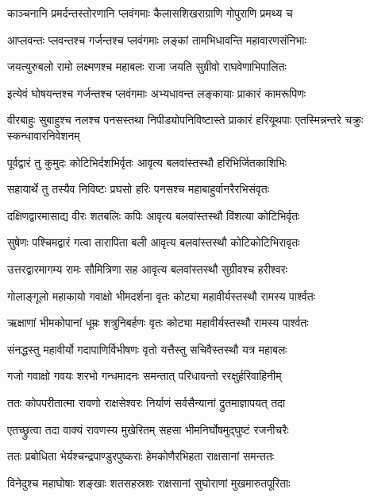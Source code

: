 \twolineshloka
{काञ्चनानि प्रमर्दन्तस्तोरणानि प्लवंगमाः}
{कैलासशिखराग्राणि गोपुराणि प्रमथ्य च} %

\twolineshloka
{आप्लवन्तः प्लवन्तश्च गर्जन्तश्च प्लवंगमाः}
{लङ्कां तामभिधावन्ति महावारणसंनिभाः} %

\twolineshloka
{जयत्युरुबलो रामो लक्ष्मणश्च महाबलः}
{राजा जयति सुग्रीवो राघवेणाभिपालितः} %

\twolineshloka
{इत्येवं घोषयन्तश्च गर्जन्तश्च प्लवंगमाः}
{अभ्यधावन्त लङ्कायाः प्राकारं कामरूपिणः} %

\threelineshloka
{वीरबाहुः सुबाहुश्च नलश्च पनसस्तथा}
{निपीड्योपनिविष्टास्ते प्राकारं हरियूथपाः}
{एतस्मिन्नन्तरे चक्रुः स्कन्धावारनिवेशनम्} %

\twolineshloka
{पूर्वद्वारं तु कुमुदः कोटिभिर्दशभिर्वृतः}
{आवृत्य बलवांस्तस्थौ हरिभिर्जितकाशिभिः} %

\twolineshloka
{सहायार्थे तु तस्यैव निविष्टः प्रघसो हरिः}
{पनसश्च महाबाहुर्वानरैरभिसंवृतः} %

\twolineshloka
{दक्षिणद्वारमासाद्य वीरः शतबलिः कपिः}
{आवृत्य बलवांस्तस्थौ विंशत्या कोटिभिर्वृतः} %

\twolineshloka
{सुषेणः पश्चिमद्वारं गत्वा तारापिता बली}
{आवृत्य बलवांस्तस्थौ कोटिकोटिभिरावृतः} %

\twolineshloka
{उत्तरद्वारमागम्य रामः सौमित्रिणा सह}
{आवृत्य बलवांस्तस्थौ सुग्रीवश्च हरीश्वरः} %

\twolineshloka
{गोलाङ्गूलो महाकायो गवाक्षो भीमदर्शना}
{वृतः कोट्या महावीर्यस्तस्थौ रामस्य पार्श्वतः} %

\twolineshloka
{ऋक्षाणां भीमकोपानां धूम्रः शत्रुनिबर्हणः}
{वृतः कोट्या महावीर्यस्तस्थौ रामस्य पार्श्वतः} %

\twolineshloka
{संनद्धस्तु महावीर्यो गदापाणिर्विभीषणः}
{वृतो यत्तैस्तु सचिवैस्तस्थौ यत्र महाबलः} %

\twolineshloka
{गजो गवाक्षो गवयः शरभो गन्धमादनः}
{समन्तात् परिधावन्तो ररक्षुर्हरिवाहिनीम्} %

\twolineshloka
{ततः कोपपरीतात्मा रावणो राक्षसेश्वरः}
{निर्याणं सर्वसैन्यानां द्रुतमाज्ञापयत् तदा} %

\twolineshloka
{एतच्छ्रुत्वा तदा वाक्यं रावणस्य मुखेरितम्}
{सहसा भीमनिर्घोषमुद्घुष्टं रजनीचरैः} %

\twolineshloka
{ततः प्रबोधिता भेर्यश्चन्द्रपाण्डुरपुष्कराः}
{हेमकोणैरभिहता राक्षसानां समन्ततः} %

\twolineshloka
{विनेदुश्च महाघोषाः शङ्खाः शतसहस्रशः}
{राक्षसानां सुघोराणां मुखमारुतपूरिताः} %

